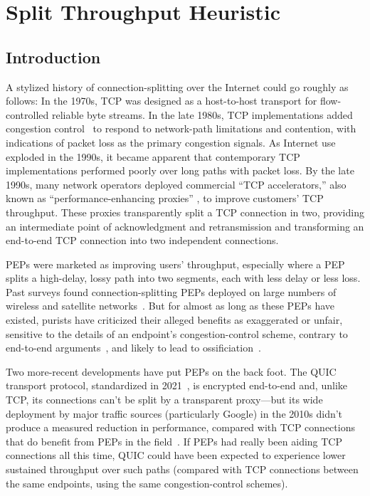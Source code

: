 \chapter{Split Throughput Heuristic}
\label{sec:splitting}

\section{Introduction}
\label{sec:splitting:intro}



A stylized history of connection-splitting over the Internet could go
roughly as follows: In the 1970s, TCP was designed as a host-to-host
transport for flow-controlled reliable byte streams. In the late
1980s, TCP implementations added congestion control~\cite{vjk} to
respond to network-path limitations and contention, with indications
of packet loss as the primary congestion signals. As Internet use
exploded in the 1990s, it became apparent that contemporary TCP
implementations performed poorly over long paths with packet loss. By
the late 1990s, many network operators deployed commercial ``TCP
accelerators,'' also known as ``performance-enhancing proxies''
\cite{rfc3135, honda2011still}, to improve customers' TCP
throughput. These proxies transparently split a TCP connection in two,
providing an intermediate point of acknowledgment and retransmission
and transforming an end-to-end TCP connection into two independent
connections.

PEPs were marketed as improving users' throughput, especially where a
PEP splits a high-delay, lossy path into two segments, each with less
delay or less loss. Past surveys found connection-splitting PEPs
deployed on large numbers of wireless and satellite
networks~\cite{rfc3135, honda2011still}. But for almost as long as
these PEPs have existed, purists have criticized their alleged
benefits as exaggerated or unfair, sensitive to the details of an
endpoint's congestion-control scheme, contrary to end-to-end
arguments~\cite{saltzer1984endtoend}, and likely to lead to
ossificiation~\cite{papastergiou2017deossifying, edeline2019bottomup}.

Two more-recent developments have put PEPs on the back foot. The QUIC
transport protocol, standardized in 2021~\cite{rfc9000}, is encrypted
end-to-end and, unlike TCP, its connections can't be split by a
transparent proxy---but its wide deployment by major traffic sources (particularly Google)
in the 2010s didn't produce a measured reduction in performance,
compared with TCP connections that do benefit from PEPs in the
field~\cite{langley2017quic}. If PEPs had really been aiding TCP connections all this time,
QUIC could have been expected to experience lower sustained throughput
over such paths (compared with TCP connections between the same
endpoints, using the same congestion-control schemes).

